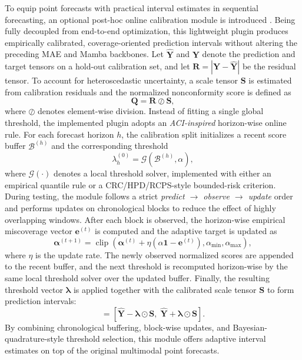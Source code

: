 \documentclass[journal]{IEEEtran}
\begin{document}
To equip point forecasts with practical interval estimates in sequential forecasting, an optional post-hoc online calibration module is introduced \cite{angelopoulos2023conformal,gibbs2021aci,gibbs2024online}. Being fully decoupled from end-to-end optimization, this lightweight plugin produces empirically calibrated, coverage-oriented prediction intervals without altering the preceding MAE and Mamba backbones. Let $\hat{\mathbf{Y}}$ and $\mathbf{Y}$ denote the prediction and target tensors on a hold-out calibration set, and let $\mathbf{R}=|\mathbf{Y}-\hat{\mathbf{Y}}|$ be the residual tensor. To account for heteroscedastic uncertainty, a scale tensor $\mathbf{S}$ is estimated from calibration residuals and the normalized nonconformity score is defined as
\begin{equation}
\mathbf{Q} = \mathbf{R} \oslash \mathbf{S},
\end{equation}
where $\oslash$ denotes element-wise division. Instead of fitting a single global threshold, the implemented plugin adopts an \textit{ACI-inspired} horizon-wise online rule. For each forecast horizon $h$, the calibration split initializes a recent score buffer $\mathcal{B}^{(h)}$ and the corresponding threshold
\begin{equation}
\lambda_h^{(0)} = \mathcal{G}\!\left(\mathcal{B}^{(h)}, \alpha\right),
\end{equation}
\noindent where $\mathcal{G}(\cdot)$ denotes a local threshold solver, implemented with either an empirical quantile rule or a CRC/HPD/RCPS-style bounded-risk criterion.
During testing, the module follows a strict \textit{predict $\rightarrow$ observe $\rightarrow$ update} order and performs updates on chronological blocks to reduce the effect of highly overlapping windows. After each block is observed, the horizon-wise empirical miscoverage vector $\mathbf{e}^{(t)}$ is computed and the adaptive target is updated as
\begin{equation}
\boldsymbol{\alpha}^{(t+1)} =
\operatorname{clip}\!\left(
\boldsymbol{\alpha}^{(t)} + \eta \left(\alpha \mathbf{1} - \mathbf{e}^{(t)}\right),
\alpha_{\min}, \alpha_{\max}
\right),
\end{equation}
where $\eta$ is the update rate. The newly observed normalized scores are appended to the recent buffer, and the next threshold is recomputed horizon-wise by the same local threshold solver over the updated buffer. Finally, the resulting threshold vector $\boldsymbol{\lambda}$ is applied together with the calibrated scale tensor $\mathbf{S}$ to form prediction intervals:
\begin{equation}
[\hat{\mathbf{Y}}^{\mathrm{lower}}, \hat{\mathbf{Y}}^{\mathrm{upper}}]
=
\left[
\hat{\mathbf{Y}} - \boldsymbol{\lambda}\odot\mathbf{S},\;
\hat{\mathbf{Y}} + \boldsymbol{\lambda}\odot\mathbf{S}
\right].
\end{equation}
By combining chronological buffering, block-wise updates, and Bayesian-quadrature-style threshold selection, this module offers adaptive interval estimates on top of the original multimodal point forecasts.
\end{document}

